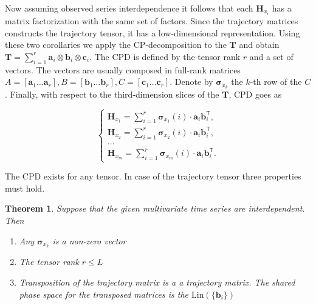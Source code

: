 \documentclass[referee, pdflatex, sn-mathphys-num]{sn-jnl}
\theoremstyle{definition}
\theoremstyle{plain}
\newtheorem{Th}{Theorem}
\begin{document}
	Now assuming observed series interdependence it follows that each $ \mathbf{H}_{x_i} $ has a matrix factorization with the same set of factors. Since the trajectory matrices constructs the trajectory tensor, it has a low-dimensional representation. Using these two corollaries we apply the CP-decomposition to the $ \mathbf{T} $ and obtain $ \mathbf{T} = \sum\limits_{i = 1}^{r} \mathbf{a}_i \otimes \mathbf{b}_i \otimes \mathbf{c}_i $. The CPD is defined by the tensor rank $ r $ and a set of vectors. The vectors are usually composed in full-rank matrices $ A = [\mathbf{a}_1 \ldots \mathbf{a}_r], B = [\mathbf{b}_1 \ldots \mathbf{b}_r], C = [\mathbf{c}_1 \ldots \mathbf{c}_r] $. Denote by $ \boldsymbol{\sigma}_{x_k} $ the $ k $-th row of the $ C $. Finally, with respect to the third-dimension slices of the $ \mathbf{T} $, CPD goes as
	
	\begin{equation}\label{eq:tSSA_decomp}
		\begin{cases}
			\mathbf{H}_{x_1} = \sum\limits_{i = 1}^{r} \boldsymbol{\sigma}_{x_1}(i) \cdot \mathbf{a}_i  \mathbf{b}_i^{\mathsf{T}},  \\
			\mathbf{H}_{x_2} = \sum\limits_{i = 1}^{r} \boldsymbol{\sigma}_{x_2}(i) \cdot \mathbf{a}_i  \mathbf{b}_i^{\mathsf{T}}, \\
			\ldots \\
			\mathbf{H}_{x_m} = \sum\limits_{i = 1}^{r} \boldsymbol{\sigma}_{x_m}(i) \cdot \mathbf{a}_i  \mathbf{b}_i^{\mathsf{T}} .
		\end{cases}
	\end{equation}
	
	The CPD exists for any tensor. In case of the trajectory tensor three properties must hold.
	
	\begin{Th}
		Suppose that the given multivariate time series are interdependent. Then
		
		\begin{enumerate}
			\item Any $ \boldsymbol{\sigma}_{x_k} $ is a non-zero vector
			\item The tensor rank $ r \le L $
			\item Transposition of the trajectory matrix is a a trajectory matrix. The shared phase space for the transposed matrices is the $ \text{Lin}(\{\mathbf{b}_i\}) $
		\end{enumerate}
	\end{Th}
	
\end{document}
